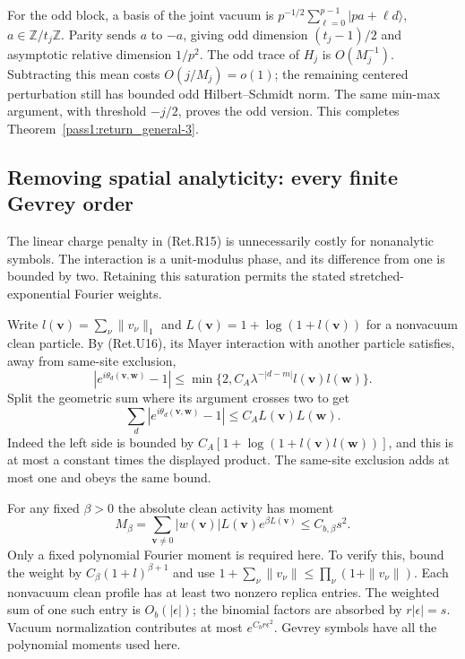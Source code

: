 For the odd block, a basis of the joint vacuum is
\(p^{-1/2}\sum_{\ell=0}^{p-1}|pa+\ell d\rangle\),
\(a\in\mathbb Z/t_j\mathbb Z\). Parity sends \(a\) to \(-a\),
giving odd dimension \((t_j-1)/2\) and asymptotic relative
dimension \(1/p^2\). The odd trace of \(H_j\) is \(O(M_j^{-1})\).
Subtracting this mean costs \(O(j/M_j)=o(1)\); the remaining
centered perturbation still has bounded odd Hilbert--Schmidt norm.
The same min-max argument, with threshold \(-j/2\), proves the
odd version. This completes Theorem~\ref{pass1:return_general-3}.

\hypertarget{removing-spatial-analyticity-every-finite-gevrey-order}{%
\subsection{Removing spatial analyticity: every finite Gevrey order}\label{removing-spatial-analyticity-every-finite-gevrey-order}}

The linear charge penalty in (Ret.R15) is unnecessarily costly for
nonanalytic symbols. The interaction is a unit-modulus phase, and
its difference from one is bounded by two. Retaining this saturation
permits the stated stretched-exponential Fourier weights.

Write \(l(\boldsymbol v)=\sum_\nu\|v_\nu\|_1\) and
\(L(\boldsymbol v)=1+\log(1+l(\boldsymbol v))\) for a nonvacuum
clean particle. By (Ret.U16), its Mayer interaction with another particle
satisfies, away from same-site exclusion,
\[
 |e^{i\theta_d(\boldsymbol v,\boldsymbol w)}-1|
 \le\min\{2,C_A\lambda^{-|d-m|}l(\boldsymbol v)l(\boldsymbol w)\}.
\]
Split the geometric sum where its argument crosses two to get
\[
 \sum_d|e^{i\theta_d(\boldsymbol v,\boldsymbol w)}-1|
                  \le C_A L(\boldsymbol v)L(\boldsymbol w). \tag{Ret.U24}
\]
Indeed the left side is bounded by
\(C_A[1+\log(1+l(\boldsymbol v)l(\boldsymbol w))]\), and this
is at most a constant times the displayed product.
The same-site exclusion adds at most one and obeys the same bound.

For any fixed \(\beta>0\) the absolute clean activity has moment
\[
 M_\beta=\sum_{\boldsymbol v\ne0}
               |w(\boldsymbol v)|L(\boldsymbol v)
                        e^{\beta L(\boldsymbol v)}
                              \le C_{b,\beta}s^2.         \tag{Ret.U25}
\]
Only a fixed polynomial Fourier moment is required here.
To verify this, bound the weight by
\(C_\beta(1+l)^{\beta+1}\) and use
\(1+\sum_\nu\|v_\nu\|\le\prod_\nu(1+\|v_\nu\|)\).
Each nonvacuum clean profile has at least two nonzero replica entries.
The weighted sum of one such entry is \(O_b(|\epsilon|)\);
the binomial factors are absorbed by \(r|\epsilon|=s\).
Vacuum normalization contributes at most \(e^{C_b r\epsilon^2}\).
Gevrey symbols have all the polynomial moments used here.


